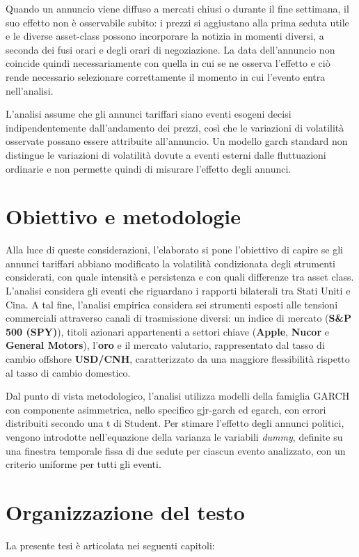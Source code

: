 Quando un annuncio viene diffuso a mercati chiusi o durante il fine settimana, il suo effetto non è osservabile subito: i prezzi si aggiustano alla prima seduta utile 
e le diverse \gls{asset-class} possono incorporare la notizia in momenti diversi, a seconda dei fusi orari e degli orari di negoziazione. La data dell'annuncio non coincide quindi 
necessariamente con quella in cui se ne osserva l'effetto e ciò rende necessario selezionare correttamente il momento in cui l'evento entra nell'analisi.

L'analisi assume che gli annunci tariffari siano eventi esogeni decisi indipendentemente dall'andamento dei prezzi, così che le variazioni di volatilità osservate possano 
essere attribuite all'annuncio. Un modello \gls{garch} standard non distingue le variazioni di volatilità dovute a eventi esterni dalle fluttuazioni ordinarie e non permette 
quindi di misurare l'effetto degli annunci.

\section{Obiettivo e metodologie}
Alla luce di queste considerazioni, l'elaborato si pone l'obiettivo di capire se gli annunci tariffari abbiano modificato la volatilità condizionata degli strumenti 
considerati, con quale intensità e persistenza e con quali differenze tra asset class. 
L'analisi considera gli eventi che riguardano i rapporti bilaterali tra Stati Uniti e Cina. A tal fine, l'analisi empirica considera sei strumenti esposti alle tensioni 
commerciali attraverso canali di trasmissione diversi: un indice di mercato (\textbf{S\&P 500 (SPY)}), titoli azionari appartenenti a settori chiave (\textbf{Apple}, \textbf{Nucor} e \textbf{General Motors}), 
l'\textbf{oro} e il mercato valutario, rappresentato dal tasso di cambio \gls{offshore} \textbf{USD/CNH}, caratterizzato da una maggiore flessibilità rispetto al tasso di cambio domestico.

Dal punto di vista metodologico, l'analisi utilizza modelli della famiglia GARCH con componente asimmetrica, nello specifico \gls{gjr-garch} ed \gls{egarch}, con errori distribuiti 
secondo una t di Student. Per stimare l'effetto degli annunci politici, vengono introdotte nell'equazione della varianza le variabili \emph{dummy}, definite su una finestra 
temporale fissa di due sedute per ciascun evento analizzato, con un criterio uniforme per tutti gli eventi.


\section{Organizzazione del testo}
La presente tesi è articolata nei seguenti capitoli: 

